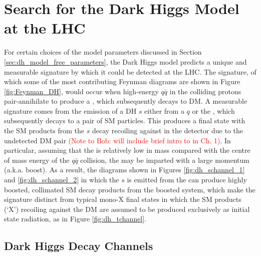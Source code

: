 \section{Search for the Dark Higgs Model at the LHC}
\label{sec:dh_search_lhc}

For certain choices of the model parameters discussed in Section \ref{sec:dh_model_free_parameters}, the Dark Higgs model predicts a unique and measurable signature by which it could be detected at the LHC. The signature, of which some of the most contributing Feynman diagrams are shown in Figure \ref{fig:Feynman_DH}, would occur when high-energy \(q\bar{q}\) in the colliding protons pair-annihilate to produce a \Zprime, which subsequently decays to DM. A measurable signature comes from the emission of a DH \(s\) either from a \(q\) or the \Zprime, which subsequently decays to a pair of SM particles. This produces a final state with the SM products from the \(s\) decay recoiling against \met in the detector due to the undetected DM pair \textcolor{red}{(Note to Bob: will include brief intro to \met in Ch. 1)}. In particular, assuming that the \Zprime is relatively low in mass compared with the centre of mass energy of the \(q\bar{q}\) collision, the \Zprime may be imparted with a large momentum (a.k.a. boost). As a result, the diagrams shown in Figures \ref{fig:dh_schannel_1} and \ref{fig:dh_schannel_2} in which the \(s\) is emitted from the \Zprime can produce highly boosted, collimated SM decay products from the boosted system, which make the signature distinct from typical mono-X final states in which the SM products (`X') recoiling against the DM are assumed to be produced exclusively as initial state radiation, as in Figure \ref{fig:dh_tchannel}.

\subsection{Dark Higgs Decay Channels}

